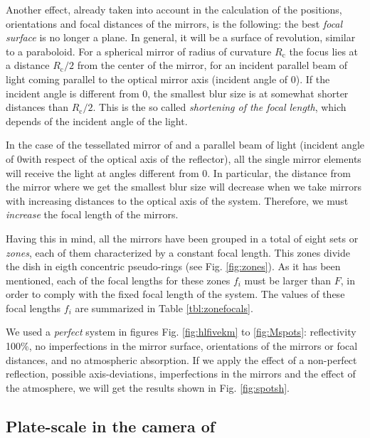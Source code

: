 Another effect, already taken into account in the calculation of the
positions, orientations and focal distances of the mirrors, is the
following: the best \emph{focal surface} is no longer a plane. In
general, it will be a surface of revolution, similar to a paraboloid.
For a spherical mirror of radius of curvature $R_{\mathrm{c}}$ the
focus lies at a distance $R_{\mathrm{c}}/2$ from the center of the
mirror, for an incident parallel beam of light coming parallel to the
optical mirror axis (incident angle of 0\deg).  If the incident angle
is different from 0\deg, the smallest blur size is at somewhat shorter
distances than $R_{\mathrm{c}}/2$. This is the so called
\emph{shortening of the focal length}, which depends of the incident
angle of the light.

In the case of the tessellated mirror of \MAGIC and a parallel beam of
light (incident angle of 0\deg with respect of the optical axis of the
reflector), all the single mirror elements will receive the light at
angles different from 0\deg. In particular, the distance from the
mirror where we get the smallest blur size will decrease when we take
mirrors with increasing distances to the optical axis of the system.
Therefore, we must \emph{increase} the focal length of the mirrors.

Having this in mind, all the mirrors have been grouped in a total of
eight sets or \emph{zones}, each of them characterized by a constant
focal length. This zones divide the dish in eigth concentric
pseudo-rings (see Fig. \ref{fig:zones}). As it has been mentioned,
each of the focal lengths for these zones $f_i$ must be larger than
$F$, in order to comply with the fixed focal length of the system. The
values of these focal lengths $f_i$ are summarized in Table
\ref{tbl:zonefocals}.

\zonefocalstbl

\thetaspotsfig

\afterpage{\clearpage}

We used a \emph{perfect} system in figures Fig. \ref{fig:hlfivekm} to
\ref{fig:Mspots}: reflectivity 100\%, no imperfections in the mirror
surface, orientations of the mirrors or focal distances, and no
atmospheric absorption. If we apply the effect of a non-perfect
reflection, possible axis-deviations, imperfections in the mirrors and
the effect of the atmosphere, we will get the results shown in Fig.
\ref{fig:spotsh}.

\subsection{Plate-scale in the camera of \MAGIC}

